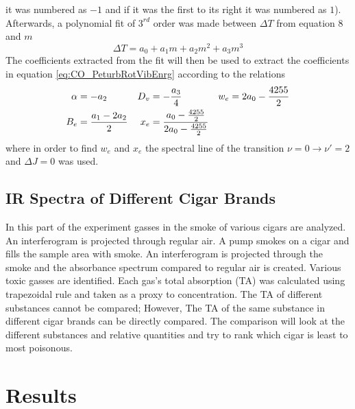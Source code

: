 \documentclass[reprint,amsmath,amssymb,aps, prl]{revtex4-2}
\begin{document}
it was numbered as $-1$ and if it was the first to its right
it was numbered as $1$). Afterwards, a polynomial fit of $3^{rd}$ order was made between $\Delta T$ from equation 8 
and $m$
\begin{equation} \label{eq:CO_EnrgStatesFit}
    \Delta T = a_{0}+a_{1}m+a_{2}m^2+a_{3}m^3
\end{equation}
The coefficients extracted from the fit will then be used to extract the coefficients in equation \ref{eq:CO_PeturbRotVibEnrg}
according to the relations 
\begin{equation}
\begin{aligned}
\alpha &=-a_{2} & D_{v}&=-\frac{a_{3}}{4} & w_{e}&=2a_{0}-\frac{4255}{2} \\
B_{e}&=\frac{a_{1}-2a_{2}}{2} &  x_{e}&=\frac{a_{0}-\frac{4255}{2}}{2a_{0}-\frac{4255}{2}}
\end{aligned}
\label{eq:COFITcoefficients}
\centering
\end{equation}
where in order to find $w_{e}$ and $x_{e}$ the spectral line of the transition $\nu =0 \rightarrow \nu'=2$ and $\Delta J =0$ was used. 

\subsection{IR Spectra of Different Cigar Brands}
In this part of the experiment gasses in the smoke of various cigars are analyzed. An interferogram is projected through regular air. A pump smokes on a cigar and fills the sample area with smoke. An interferogram is projected through the smoke and the absorbance spectrum compared to regular air is created. Various toxic gasses are identified. Each gas's total absorption (TA) was calculated using trapezoidal rule \cite{numerical} and taken as a proxy to concentration. The TA of different substances cannot be compared; However, The TA of the same substance in different cigar brands can be directly compared. The comparison will look at the different substances and relative quantities and try to rank which cigar is least to most poisonous.

\section{Results}
\end{document}
